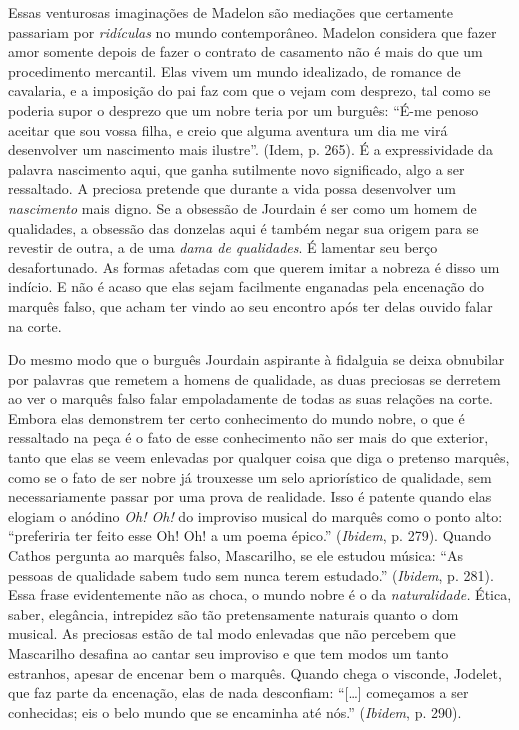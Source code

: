 Essas venturosas imaginações de Madelon são mediações que certamente
passariam por \emph{ridículas} no mundo contemporâneo. Madelon considera
que fazer amor somente depois de fazer o contrato de casamento não é
mais do que um procedimento mercantil. Elas vivem um mundo idealizado,
de romance de cavalaria, e a imposição do pai faz com que o vejam com
desprezo, tal como se poderia supor o desprezo que um nobre teria por um
burguês: ``É-me penoso aceitar que sou vossa filha, e creio que alguma
aventura um dia me virá desenvolver um nascimento mais ilustre''. (Idem,
p. 265). É a expressividade da palavra nascimento aqui, que ganha
sutilmente novo significado, algo a ser ressaltado. A preciosa pretende
que durante a vida possa desenvolver um \emph{nascimento} mais digno. Se
a obsessão de Jourdain é ser como um homem de qualidades, a obsessão das
donzelas aqui é também negar sua origem para se revestir de outra, a de
uma \emph{dama de qualidades}. É lamentar seu berço desafortunado. As
formas afetadas com que querem imitar a nobreza é disso um indício. E
não é acaso que elas sejam facilmente enganadas pela encenação do
marquês falso, que acham ter vindo ao seu encontro após ter delas ouvido
falar na corte.

Do mesmo modo que o burguês Jourdain aspirante à fidalguia se deixa
obnubilar por palavras que remetem a homens de qualidade, as duas
preciosas se derretem ao ver o marquês falso falar empoladamente de
todas as suas relações na corte. Embora elas demonstrem ter certo
conhecimento do mundo nobre, o que é ressaltado na peça é o fato de esse
conhecimento não ser mais do que exterior, tanto que elas se veem
enlevadas por qualquer coisa que diga o pretenso marquês, como se o fato
de ser nobre já trouxesse um selo apriorístico de qualidade, sem
necessariamente passar por uma prova de realidade. Isso é patente quando
elas elogiam o anódino \emph{Oh! Oh!} do improviso musical do marquês
como o ponto alto: ``preferiria ter feito esse Oh! Oh! a um poema
épico.'' (\emph{Ibidem}, p. 279). Quando Cathos pergunta ao marquês
falso, Mascarilho, se ele estudou música: ``As pessoas de qualidade
sabem tudo sem nunca terem estudado.'' (\emph{Ibidem}, p. 281). Essa
frase evidentemente não as choca, o mundo nobre é o da
\emph{naturalidade.} Ética, saber, elegância, intrepidez são tão
pretensamente naturais quanto o dom musical. As preciosas estão
de tal modo enlevadas que não percebem que Mascarilho desafina ao cantar
seu improviso e que tem modos um tanto estranhos, apesar de encenar bem
o marquês. Quando chega o visconde, Jodelet, que faz parte da encenação,
elas de nada desconfiam: ``[\ldots{}] começamos a ser conhecidas; eis o
belo mundo que se encaminha até nós.'' (\emph{Ibidem}, p. 290).

